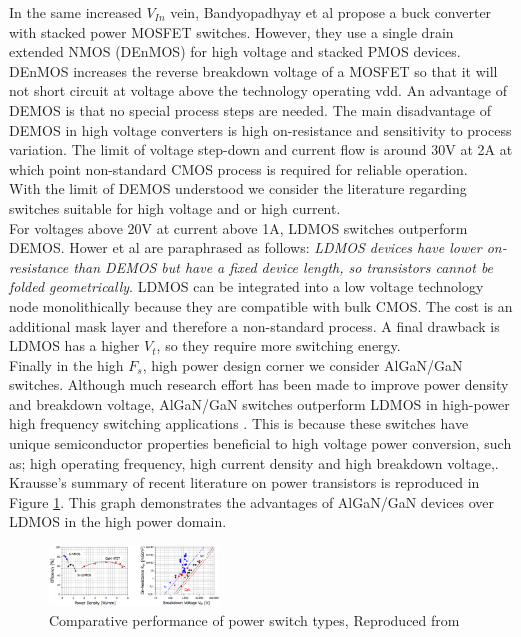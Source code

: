 \documentclass[letterpaper,twocolumn,10pt]{article}
\begin{document}
\indent In the same increased $V_{In}$ vein, Bandyopadhyay et al\cite{Bandyopadhyay2011} propose a buck converter with stacked power MOSFET switches. However, they use a single drain extended NMOS (DEnMOS) for high voltage and stacked PMOS devices. DEnMOS increases the reverse breakdown voltage of a MOSFET so that it will not short circuit at voltage above the technology operating vdd. An advantage of DEMOS is that no special process steps are needed. The main disadvantage of DEMOS in high voltage converters is high on-resistance and sensitivity to process variation. The limit of voltage step-down and current flow is around 30V at 2A \cite{Hower2005} at which point non-standard CMOS process is required for reliable operation.\\
\indent With the limit of DEMOS understood we consider the literature regarding switches suitable for high voltage and or high current.\\
For voltages above 20V at current above 1A, LDMOS switches outperform DEMOS. Hower et al\cite{Hower2005} are paraphrased as follows: \textit{LDMOS devices have lower on-resistance than DEMOS but have a fixed device length, so transistors cannot be folded geometrically}. LDMOS can be integrated into a low voltage technology node monolithically because they are compatible with bulk CMOS. The cost is an additional mask layer and therefore a non-standard process. A final drawback is LDMOS has a higher $V_t$, so they require more switching energy.\\
\indent Finally in the high $F_s$, high power design corner we consider AlGaN/GaN switches. Although much research effort has been made to improve power density and breakdown voltage, AlGaN/GaN switches outperform LDMOS in high-power high frequency switching applications \cite{Goyal2013}. This is because these switches have unique semiconductor properties beneficial to high voltage power conversion, such as; high operating frequency, high current density and high breakdown voltage\cite{Alamo2009},\cite{Mustapha2008}. Krausse's\cite{Krausse2013} summary of recent literature on power transistors is reproduced in Figure \ref{GaNCharacter}. This graph demonstrates the advantages of AlGaN/GaN devices over LDMOS in the high power domain.\\ %
\begin{figure}[here]
\includegraphics[width=0.4\textwidth]{TransistorPerf}
\caption{Comparative performance of power switch types, Reproduced from\cite{Krausse2013}}
\label{GaNCharacter}
\end{figure}
\end{document}
